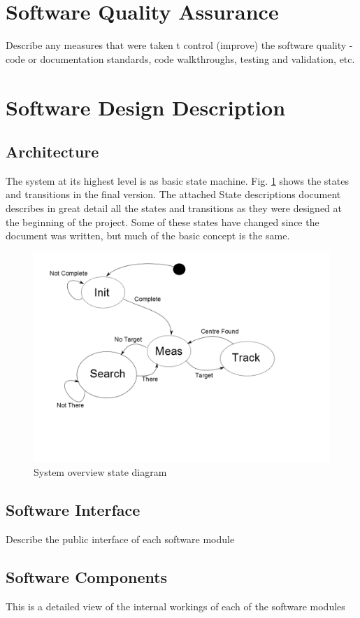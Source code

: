 \documentclass[]{report}
\begin{document}
\section{Software Quality Assurance}
Describe any measures that were taken t control (improve) the software quality - code or documentation standards, code walkthroughs, testing and validation, etc.

\section{Software Design Description}
\subsection{Architecture}
The system at its highest level is as basic state machine. Fig. \ref{fig:OperationStateTransitionDiagram} shows the states and transitions in the final version. The attached State descriptions document describes in great detail all the states and transitions as they were designed at the beginning of the project. Some of these states have changed since the document was written, but much of the basic concept is the same.

\begin{figure}
	\centering
	\includegraphics[width=0.7\linewidth]{"../Diagrams/Operation State Transition Diagram"}
	\caption[State Diagram]{System overview state diagram}
	\label{fig:OperationStateTransitionDiagram}
\end{figure}

\subsection{Software Interface}
Describe the public interface of each software module

\subsection{Software Components}
This is a detailed view of the internal workings of each of the software modules
\end{document}
